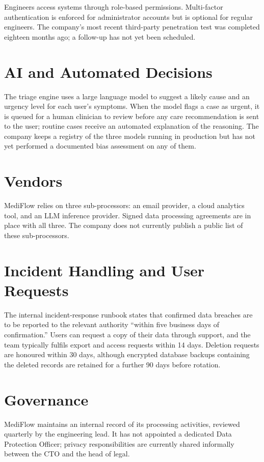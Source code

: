 \documentclass[11pt]{article}
\begin{document}
Engineers access systems through role-based permissions. Multi-factor authentication is
enforced for administrator accounts but is optional for regular engineers. The company's
most recent third-party penetration test was completed eighteen months ago; a follow-up has
not yet been scheduled.

\section{AI and Automated Decisions}
The triage engine uses a large language model to suggest a likely cause and an urgency level
for each user's symptoms. When the model flags a case as urgent, it is queued for a human
clinician to review before any care recommendation is sent to the user; routine cases
receive an automated explanation of the reasoning. The company keeps a registry of the three
models running in production but has not yet performed a documented bias assessment on any
of them.

\section{Vendors}
MediFlow relies on three sub-processors: an email provider, a cloud analytics tool, and an
LLM inference provider. Signed data processing agreements are in place with all three. The
company does not currently publish a public list of these sub-processors.

\section{Incident Handling and User Requests}
The internal incident-response runbook states that confirmed data breaches are to be
reported to the relevant authority ``within five business days of confirmation.'' Users can
request a copy of their data through support, and the team typically fulfils export and
access requests within 14 days. Deletion requests are honoured within 30 days, although
encrypted database backups containing the deleted records are retained for a further 90 days
before rotation.

\section{Governance}
MediFlow maintains an internal record of its processing activities, reviewed quarterly by
the engineering lead. It has not appointed a dedicated Data Protection Officer; privacy
responsibilities are currently shared informally between the CTO and the head of legal.
\end{document}
